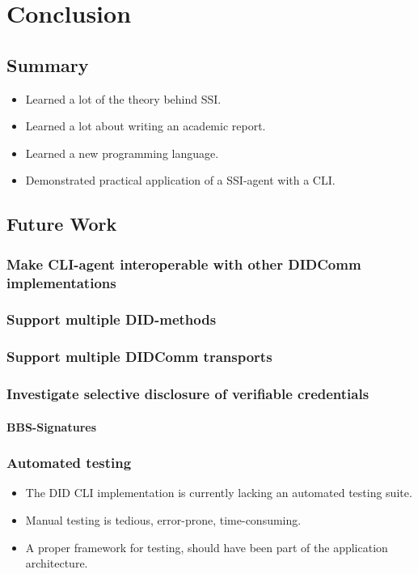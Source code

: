 \chapter{Conclusion}


\section{Summary}
\begin{itemize}
    \item Learned a lot of the theory behind SSI.
    \item Learned a lot about writing an academic report.
    \item Learned a new programming language.
    \item Demonstrated practical application of a SSI-agent with a CLI.
\end{itemize}



\section{Future Work}

\subsection{Make CLI-agent interoperable with other DIDComm implementations}

\subsection{Support multiple DID-methods}

\subsection{Support multiple DIDComm transports}

\subsection{Investigate selective disclosure of verifiable credentials}

\subsubsection{BBS-Signatures}

\subsection{Automated testing}

\begin{itemize}
    \item The DID CLI implementation is currently lacking an automated testing suite.
    \item Manual testing is tedious, error-prone, time-consuming.
    \item A proper framework for testing, should have been part of the application architecture.
\end{itemize}
